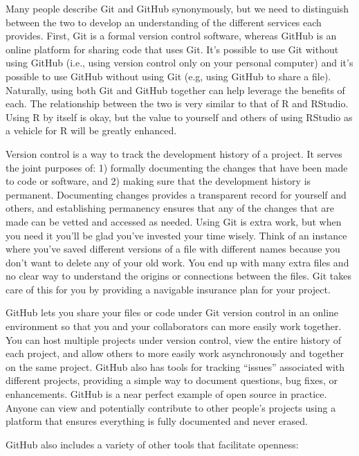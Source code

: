 \documentclass[
]{book}
\begin{document}
Many people describe Git and GitHub synonymously, but we need to distinguish between the two to develop an understanding of the different services each provides. First, Git is a formal version control software, whereas GitHub is an online platform for sharing code that uses Git. It's possible to use Git without using GitHub (i.e., using version control only on your personal computer) and it's possible to use GitHub without using Git (e.g, using GitHub to share a file). Naturally, using both Git and GitHub together can help leverage the benefits of each. The relationship between the two is very similar to that of R and RStudio. Using R by itself is okay, but the value to yourself and others of using RStudio as a vehicle for R will be greatly enhanced.

Version control is a way to track the development history of a project. It serves the joint purposes of: 1) formally documenting the changes that have been made to code or software, and 2) making sure that the development history is permanent. Documenting changes provides a transparent record for yourself and others, and establishing permanency ensures that any of the changes that are made can be vetted and accessed as needed. Using Git is extra work, but when you need it you'll be glad you've invested your time wisely. Think of an instance where you've saved different versions of a file with different names because you don't want to delete any of your old work. You end up with many extra files and no clear way to understand the origins or connections between the files. Git takes care of this for you by providing a navigable insurance plan for your project.

GitHub lets you share your files or code under Git version control in an online environment so that you and your collaborators can more easily work together. You can host multiple projects under version control, view the entire history of each project, and allow others to more easily work asynchronously and together on the same project. GitHub also has tools for tracking ``issues'' associated with different projects, providing a simple way to document questions, bug fixes, or enhancements. GitHub is a near perfect example of open source in practice. Anyone can view and potentially contribute to other people's projects using a platform that ensures everything is fully documented and never erased.

GitHub also includes a variety of other tools that facilitate openness:
\end{document}
